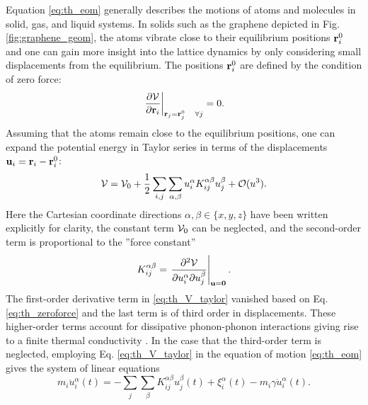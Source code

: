 Equation \eqref{eq:th_eom} generally describes the motions of atoms and molecules in solid, gas, and liquid systems. In solids such as the graphene depicted in Fig. \ref{fig:graphene_geom}, the atoms vibrate close to their equilibrium positions $\mathbf{r}_i^0$ and one can gain more insight into the lattice dynamics by only considering small displacements from the equilibrium. The positions $\mathbf{r}_i^0$ are defined by the condition of zero force:
\begin{equation}
 \left. \frac{\partial \mathcal{V}}{\partial \mathbf{r}_i} \right|_{\mathbf{r}_j=\mathbf{r}_j^0 \quad \forall j} = 0. \label{eq:th_zeroforce}
\end{equation}
Assuming that the atoms remain close to the equilibrium positions, one can expand the potential energy in Taylor series in terms of the displacements $\mathbf{u}_i=\mathbf{r}_i-\mathbf{r}_i^0$:
\begin{equation}
 \mathcal{V} = \mathcal{V}_0 + \frac{1}{2} \sum_{i,j} \sum_{\alpha,\beta} u_i^{\alpha} K_{ij}^{\alpha \beta} u_j^{\beta}  + \mathcal{O}(u^3). \label{eq:th_V_taylor}
\end{equation}
Here the Cartesian coordinate directions $\alpha,\beta \in \{x,y,z\}$ have been written explicitly for clarity, the constant term $\mathcal{V}_0$ can be neglected, and the second-order term is proportional to the ''force constant''
\begin{equation}
 K_{ij}^{\alpha\beta} = \left. \frac{\partial^2 \mathcal{V}}{\partial u_i^{\alpha} \partial u_j^{\beta}} \right|_{\mathbf{u}=\mathbf{0}}. \label{eq:th_K_def}
\end{equation}
The first-order derivative term in \eqref{eq:th_V_taylor} vanished based on Eq. \eqref{eq:th_zeroforce} and the last term is of third order in displacements. These higher-order terms account for dissipative phonon-phonon interactions giving rise to a finite thermal conductivity \cite{ziman}. In the case that the third-order term is neglected, employing Eq. \eqref{eq:th_V_taylor} in the equation of motion \eqref{eq:th_eom} gives the system of linear equations %
\begin{equation}
 m_i \ddot{u}_i^{\alpha}(t) = - \sum_j \sum_{\beta} K_{ij}^{\alpha\beta} u_j^{\beta}(t) + \xi_i^{\alpha}(t) -m_i \gamma \dot{u}_i^{\alpha}(t). \label{eq:th_eom_phonon}
\end{equation}

